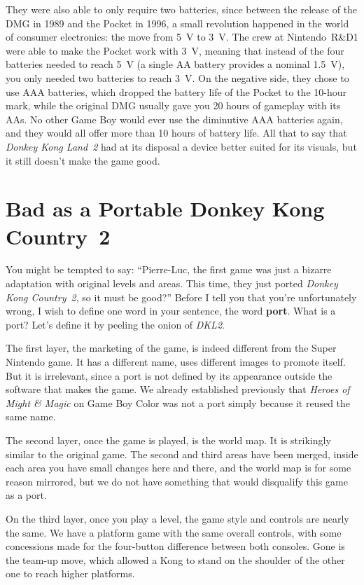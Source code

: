 \documentclass{book}
\begin{document}
They were also able to only require two batteries, since between the release of the DMG in 1989 and the Pocket in 1996, a small revolution happened in the world of consumer electronics: the move from 5~V to 3~V. The crew at Nintendo~R\&D1 were able to make the Pocket work with 3~V, meaning that instead of the four batteries needed to reach 5~V (a single AA battery provides a nominal 1.5~V), you only needed two batteries to reach 3~V. On the negative side, they chose to use AAA batteries, which dropped the battery life of the Pocket to the 10-hour mark, while the original DMG usually gave you 20 hours of gameplay with its AAs. No other Game Boy would ever use the diminutive AAA batteries again, and they would all offer more than 10 hours of battery life. All that to say that \emph{Donkey Kong Land~2} had at its disposal a device better suited for its visuals, but it still doesn’t make the game good.\par
\FloatBarrier\section*{Bad as a Portable Donkey Kong Country~2}
You might be tempted to say: “Pierre-Luc, the first game was just a bizarre adaptation with original levels and areas. This time, they just ported \emph{Donkey Kong Country~2}, so it must be good?” Before I tell you that you’re unfortunately wrong, I wish to define one word in your sentence, the word \textbf{port}. What is a port? Let’s define it by peeling the onion of \emph{DKL2}.\par
The first layer, the marketing of the game, is indeed different from the Super Nintendo game. It has a different name, uses different images to promote itself. But it is irrelevant, since a port is not defined by its appearance outside the software that makes the game. We already established previously that \emph{Heroes of Might \& Magic} on Game Boy Color was not a port simply because it reused the same name.\par
The second layer, once the game is played, is the world map. It is strikingly similar to the original game. The second and third areas have been merged, inside each area you have small changes here and there, and the world map is for some reason mirrored, but we do not have something that would disqualify this game as a port.\par
On the third layer, once you play a level, the game style and controls are nearly the same. We have a platform game with the same overall controls, with some concessions made for the four-button difference between both consoles. Gone is the team-up move, which allowed a Kong to stand on the shoulder of the other one to reach higher platforms.\par
\end{document}
